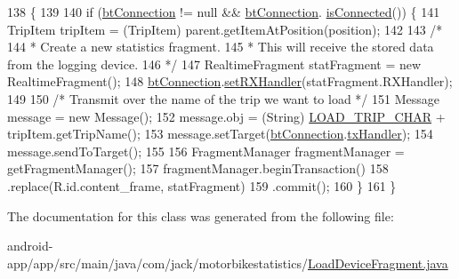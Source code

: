 \begin{DoxyCode}
138                                                                                          \{
139 
140             \textcolor{keywordflow}{if} (\hyperlink{classcom_1_1jack_1_1motorbikestatistics_1_1_load_device_fragment_a7a446c4528638e9d169481c3ff1471b0}{btConnection} != null && \hyperlink{classcom_1_1jack_1_1motorbikestatistics_1_1_load_device_fragment_a7a446c4528638e9d169481c3ff1471b0}{btConnection}.
      \hyperlink{classcom_1_1jack_1_1motorbikestatistics_1_1_b_t_connection_a22f33e46d9f460d78865d4c63b645357}{isConnected}()) \{
141                 TripItem tripItem = (TripItem) parent.getItemAtPosition(position);
142 
143                 \textcolor{comment}{/*}
144 \textcolor{comment}{                 * Create a new statistics fragment.}
145 \textcolor{comment}{                 * This will receive the stored data from the logging device.}
146 \textcolor{comment}{                 */}
147                 RealtimeFragment statFragment = \textcolor{keyword}{new} RealtimeFragment();
148                 \hyperlink{classcom_1_1jack_1_1motorbikestatistics_1_1_load_device_fragment_a7a446c4528638e9d169481c3ff1471b0}{btConnection}.\hyperlink{classcom_1_1jack_1_1motorbikestatistics_1_1_b_t_connection_aae8ee75e78f5beff98572bf3b13a60b8}{setRXHandler}(statFragment.RXHandler);
149 
150                 \textcolor{comment}{/* Transmit over the name of the trip we want to load */}
151                 Message message = \textcolor{keyword}{new} Message();
152                 message.obj = (String) \hyperlink{classcom_1_1jack_1_1motorbikestatistics_1_1_load_device_fragment_a484328e2963103665fae8801557bef73}{LOAD\_TRIP\_CHAR} + tripItem.getTripName();
153                 message.setTarget(\hyperlink{classcom_1_1jack_1_1motorbikestatistics_1_1_load_device_fragment_a7a446c4528638e9d169481c3ff1471b0}{btConnection}.\hyperlink{classcom_1_1jack_1_1motorbikestatistics_1_1_b_t_connection_a7a88b2007af6a9a5c8667a9f1df980cc}{txHandler});
154                 message.sendToTarget();
155 
156                 FragmentManager fragmentManager = getFragmentManager();
157                 fragmentManager.beginTransaction()
158                         .replace(R.id.content\_frame, statFragment)
159                         .commit();
160             \}
161         \}
\end{DoxyCode}


The documentation for this class was generated from the following file\+:\begin{DoxyCompactItemize}
\item 
android-\/app/app/src/main/java/com/jack/motorbikestatistics/\hyperlink{_load_device_fragment_8java}{Load\+Device\+Fragment.\+java}\end{DoxyCompactItemize}
